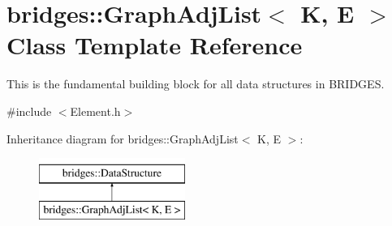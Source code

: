 \hypertarget{classbridges_1_1_graph_adj_list}{}\section{bridges\+:\+:Graph\+Adj\+List$<$ K, E $>$ Class Template Reference}
\label{classbridges_1_1_graph_adj_list}


This is the fundamental building block for all data structures in B\+R\+I\+D\+G\+E\+S.  




{\ttfamily \#include $<$Element.\+h$>$}

Inheritance diagram for bridges\+:\+:Graph\+Adj\+List$<$ K, E $>$\+:\begin{figure}[H]
\begin{center}
\leavevmode
\includegraphics[height=2.000000cm]{classbridges_1_1_graph_adj_list}
\end{center}
\end{figure}
